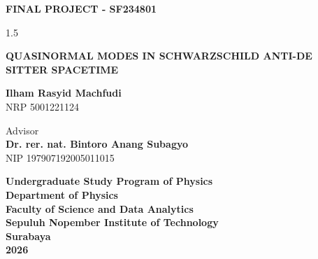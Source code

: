   \begin{large}
    \textbf{FINAL PROJECT - SF234801}
  \end{large}

  \vspace{\fill}

  \begin{spacing}{1.5}
    \begin{Large}
      \textbf{QUASINORMAL MODES IN SCHWARZSCHILD ANTI-DE SITTER SPACETIME}
    \end{Large}
  \end{spacing}

  \vspace{\fill}

  \begin{large}
    \textbf{Ilham Rasyid Machfudi} \\
    \textmd{NRP 5001221124}
  \end{large}

  \vspace{\fill}

  \begin{large}
    \textmd{Advisor} \\
    \textbf{Dr. rer. nat. Bintoro Anang Subagyo} \\
    \textmd{NIP 197907192005011015} \\
  \end{large}

  \vspace{\fill}

  \begin{large}
    \textbf{Undergraduate Study Program of Physics} \\
    \textbf{Department of Physics} \\
    \textbf{Faculty of Science and Data Analytics} \\
    \textbf{Sepuluh Nopember Institute of Technology} \\
    \textbf{Surabaya}\\
    \textbf{2026}
  \end{large}